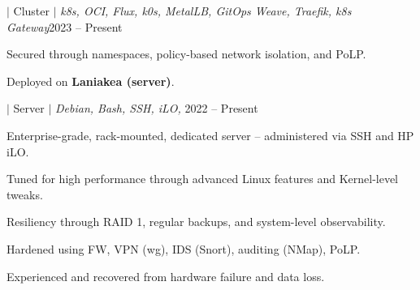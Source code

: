\documentclass[a4paper,11pt]{article}
\begin{document}
\begin{sectionList}
\begin{project}{\textbf{\laniakea} $|$ Cluster $|$ \textit{k8s, OCI, Flux, k0s, MetalLB, GitOps Weave, Traefik, k8s Gateway}}{2023 -- Present}
        \item Secured through namespaces, policy-based network isolation, and PoLP.
        \item Deployed on \textbf{Laniakea (server)}.
    \end{project}
    \begin{project}{\textbf{\laniakea} $|$ Server $|$ \textit{Debian, Bash, SSH, iLO, }}{2022 -- Present}
        \item Enterprise-grade, rack-mounted, dedicated server -- administered via SSH and HP iLO.
        \item Tuned for high performance through advanced Linux features and Kernel-level tweaks.
        \item Resiliency through RAID 1, regular backups, and system-level observability.
        \item Hardened using FW, VPN (wg), IDS (Snort), auditing (NMap), PoLP.
        \item Experienced and recovered from hardware failure and data loss.
    \end{project}
\end{sectionList}
\end{document}
